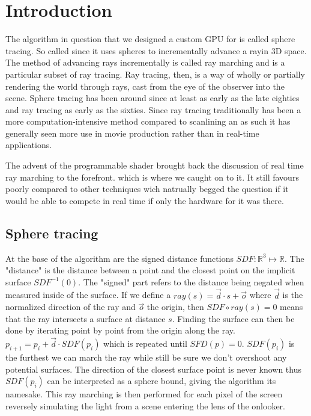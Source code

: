 \chapter{Introduction} 

The algorithm in question that we designed a custom GPU for is called sphere
tracing.\cite{Hart1996} So called since it uses spheres to incrementally
advance a ray\footnotemark in 3D space. The method of advancing rays
incrementally is called ray marching and is a particular subset of ray
tracing.\cite{Whitted1980} Ray tracing, then, is a way of wholly or partially
rendering the world through rays, cast from the eye of the observer into the
scene.  Sphere tracing has been around since at least as early as the late
eighties and ray tracing as early as the sixties.\cite{Hart1989,Appel1968}
Since ray tracing traditionally has been a more computation-intensive method
compared to scanlining\cite{Wylie1967} an as such it has generally seen more
use in movie production rather than in real-time applications.\cite{ref_needed?} 


The advent of the programmable shader brought back the discussion of real time
ray marching to the forefront. which is where we caught on to it.
\cite{JamieWong2016} It still favours poorly compared to other techniques wich
natrually begged the question if it would be able to compete in real time if
only the hardware for it was there.


\section{Sphere tracing}

At the base of the algorithm are the signed distance functions
$SDF:\mathbb{R}^{3}\mapsto\mathbb{R}$. The "distance" is the distance between a
point and the closest point on the implicit surface $SDF^{-1}(0)$. The "signed"
part refers to the distance being negated when measured inside of the surface.
If we define a $ray(s) = \vec{d} \cdot s + \vec{o}$ where $\vec{d}$ is the
normalized direction of the ray and $\vec{o}$ the origin, then $SDF\circ ray(s)
  = 0$ means that the ray intersects a surface at distance $s$. Finding the
  surface can then be done by iterating point by point from the origin along
  the ray.  $p_{i+1} = p_i + \vec{d}\cdot SDF(p_i)$ which is repeated until
  $SFD(p) = 0$.  $SDF(p_i)$ is the furthest we can march the ray while still be
  sure we don't overshoot any potential surfaces. The direction of the closest
  surface point is never known thus $SDF(p_i)$ can be interpreted as a sphere
  bound, giving the algorithm its namesake. This ray marching is then performed
  for each pixel of the screen reversely simulating the light from a scene
  entering the lens of the onlooker.

